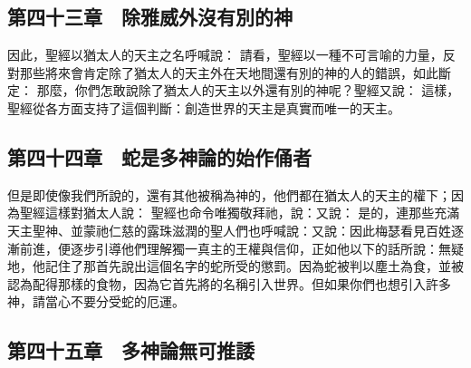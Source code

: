 \subsection{第四十三章　除雅威外沒有別的神}

因此，聖經以猶太人的天主之名呼喊說： 請看，聖經以一種不可言喻的力量，反對那些將來會肯定除了猶太人的天主外在天地間還有別的神的人的錯誤，如此斷定： 那麼，你們怎敢說除了猶太人的天主以外還有別的神呢？聖經又說： 這樣，聖經從各方面支持了這個判斷：創造世界的天主是真實而唯一的天主。\par


\subsection{第四十四章　蛇是多神論的始作俑者}

但是即使像我們所說的，還有其他被稱為神的，他們都在猶太人的天主的權下；因為聖經這樣對猶太人說： 聖經也命令唯獨敬拜祂，說：又說： 是的，連那些充滿天主聖神、並蒙祂仁慈的露珠滋潤的聖人們也呼喊說：又說：因此梅瑟看見百姓逐漸前進，便逐步引導他們理解獨一真主的王權與信仰，正如他以下的話所說：無疑地，他記住了那首先說出這個名字的蛇所受的懲罰。因為蛇被判以塵土為食，並被認為配得那樣的食物，因為它首先將的名稱引入世界。但如果你們也想引入許多神，請當心不要分受蛇的厄運。\par


\subsection{第四十五章　多神論無可推諉}

